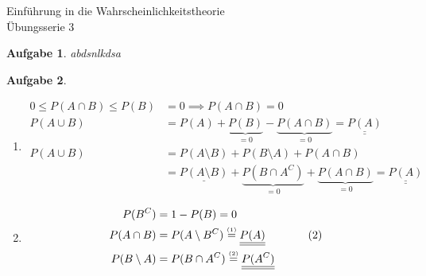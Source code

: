 \documentclass[11pt]{article}
\theoremstyle{break}
\newtheorem{task}{Aufgabe}
\begin{document}
\begin{center}
\Large{Einführung in die Wahrscheinlichkeitstheorie}\\
\large{Übungsserie 3}
\end{center}
\begin{task}
abdsnlkdsa
\end{task}

\setcounter{task}{2}
\begin{task}
\hfill\vspace{-5mm}
\begin{enumerate}[label={(\alph*)}]
\item \hfill\vspace{-8mm}
\begin{align*}
0\leq P(A\cap B) \leq P(B) &= 0 \implies P(A\cap B) = 0&\\
P(A\cup B) &= P(A) + \underbrace{P(B)}_{=0} - \underbrace{P(A\cap B)}_{=0} = \underline{\underline{P(A)}}&\\
P(A\cup B) &= P(A\setminus B) + P(B\setminus A) + P(A\cap B)&\\
&= \underline{P(A\setminus B)} + \underbrace{P(B\cap A^C)}_{=0} + \underbrace{P(A\cap B)}_{=0} = \underline{\underline{P(A)}}&\tag{1}
\end{align*}
\item \hfill\vspace{-8mm}
\begin{align*}
P(B^C)&=1-P(B)=0&\\
P(A\cap B)&=P(A\setminus B^C) \stackrel{\mbox{\tiny (1)}}{=} \underline{\underline{P(A)}}&\tag{2}\\
P(B\setminus A)&=P(B\cap A^C) \stackrel{\mbox{\tiny (2)}}{=} \underline{\underline{P(A^C)}}
\end{align*}
\end{enumerate}
\end{task}
\end{document}
